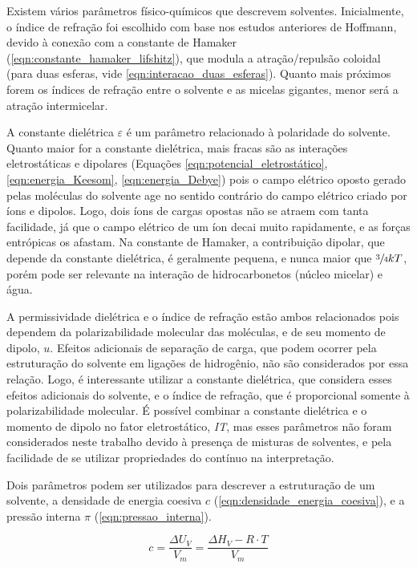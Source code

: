 		
		Existem vários parâmetros físico-químicos que descrevem solventes. Inicialmente, o índice de refração foi escolhido com base nos estudos anteriores de Hoffmann, devido à conexão com a constante de Hamaker (\autoref{eqn:constante_hamaker_lifshitz}), que modula a atração/repulsão coloidal (para duas esferas, vide \autoref{eqn:interacao_duas_esferas}). Quanto mais próximos forem os índices de refração entre o solvente e as micelas gigantes, menor será a atração intermicelar.
		
		A constante dielétrica \(\varepsilon\) é um parâmetro relacionado à polaridade do solvente. Quanto maior for a constante dielétrica, mais fracas são as interações eletrostáticas e dipolares (Equações \ref{eqn:potencial_eletrostático}, \ref{eqn:energia_Keesom}, \ref{eqn:energia_Debye}) pois o campo elétrico oposto gerado pelas moléculas do solvente age no sentido contrário do campo elétrico criado por íons e dipolos. Logo, dois íons de cargas opostas não se atraem com tanta facilidade, já que o campo elétrico de um íon decai muito rapidamente, e as forças entrópicas os afastam. Na constante de Hamaker, a contribuição dipolar, que depende da constante dielétrica, é geralmente pequena, e nunca maior que \(\sfrac{3}{4}kT\), porém pode ser relevante na interação de hidrocarbonetos (núcleo micelar) e água.
		
		A permissividade dielétrica e o índice de refração estão ambos relacionados pois dependem da polarizabilidade molecular das moléculas, e de seu momento de dipolo, \(u\). Efeitos adicionais de separação de carga, que podem ocorrer pela estruturação do solvente em ligações de hidrogênio, não são considerados por essa relação. Logo, é interessante utilizar a constante dielétrica, que considera esses efeitos adicionais do solvente, e o índice de refração, que é proporcional somente à polarizabilidade molecular. É possível combinar a constante dielétrica e o momento de dipolo no fator eletrostático, \emph{IT}, mas esses parâmetros não foram considerados neste trabalho devido à presença de misturas de solventes, e pela facilidade de se utilizar propriedades do contínuo na interpretação. %
		
		Dois parâmetros podem ser utilizados para descrever a estruturação de um solvente, a densidade de energia coesiva \(c\) (\autoref{eqn:densidade_energia_coesiva}), e a pressão interna \(\pi\) (\autoref{eqn:pressao_interna}).  %
		
		\begin{equation}
			c = \dfrac{\Delta U_V}{V_m} = \dfrac{\Delta H_V - R\cdot T}{V_m}
			\label{eqn:densidade_energia_coesiva}
		\end{equation}
		
